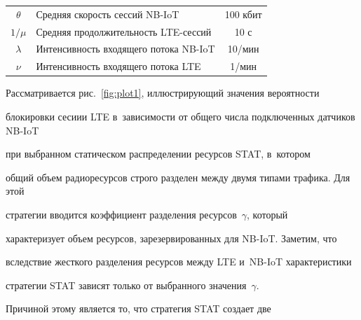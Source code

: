 \begin{table}[b]
\begin{center}
\begin{tabular}{|c|l|c|}


            $\theta$                  & Средняя скорость сессий NB-IoT  & 


100 кбит\\




            $1/\mu$                    &Средняя продолжительность LTE-сессий & 10 с\\




            $\lambda$                 &Интенсивность входящего потока NB-IoT & 10\!/\!мин\\




            $\nu$                        &Интенсивность входящего потока LTE & 1\!/мин\\


            \hline


        \end{tabular}


    \end{center}


\end{table}














Рассматривается рис.~\ref{fig:plot1}, иллюстрирующий значения вероятности 


блокировки сесиии LTE в~зависимости от общего числа подключенных датчиков NB-IoT 


при выбранном статическом распределении ресурсов \mbox{STAT}, в~котором 


общий объем радиоресурсов строго разделен между двумя типами трафика. Для этой 


стратегии вводится коэффициент разделения ресурсов~$\gamma$, который 


характеризует объем ресурсов, зарезервированных для NB-IoT. Заметим, что 


вследствие жесткого разделения ресурсов между LTE и~NB-IoT характеристики 


стратегии \mbox{STAT} зависят только от выбранного значения~$\gamma$. 


Причиной этому является то, что стратегия \mbox{STAT} создает две 


